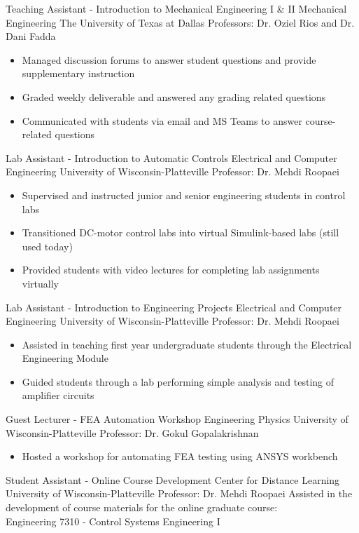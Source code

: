 \documentclass[11pt,letterpaper,roman]{moderncv} %
\begin{document}
{Teaching Assistant - Introduction to Mechanical Engineering I \& II}
{Mechanical Engineering}
{The University of Texas at Dallas}
{Professors: Dr. Oziel Rios and Dr. Dani Fadda}
{\begin{itemize}
    \item Managed discussion forums to answer student questions and provide supplementary instruction
    \item Graded weekly deliverable and answered any grading related questions
    \item Communicated with students via email and MS Teams to answer course-related questions
\end{itemize}
}

{Lab Assistant - Introduction to Automatic Controls}
{Electrical and Computer Engineering}
{University of Wisconsin-Platteville}
{Professor: Dr. Mehdi Roopaei}
{\begin{itemize}
    \item Supervised and instructed junior and senior engineering students in control labs
    \item Transitioned DC-motor control labs into virtual Simulink-based labs (still used today)
    \item Provided students with video lectures for completing lab assignments virtually
\end{itemize}
}

{Lab Assistant - Introduction to Engineering Projects}
{Electrical and Computer Engineering}
{University of Wisconsin-Platteville}
{Professor: Dr. Mehdi Roopaei}
{\begin{itemize}
    \item Assisted in teaching first year undergraduate students through the Electrical Engineering Module
    \item Guided students through a lab performing simple analysis and testing of amplifier circuits
\end{itemize}
}

{Guest Lecturer - FEA Automation Workshop}
{Engineering Physics}
{University of Wisconsin-Platteville}
{Professor: Dr. Gokul Gopalakrishnan}
{\begin{itemize}
    \item Hosted a workshop for automating FEA testing using ANSYS workbench
\end{itemize}
}

{Student Assistant - Online Course Development}
{Center for Distance Learning}
{University of Wisconsin-Platteville}
{Professor: Dr. Mehdi Roopaei}
{Assisted in the development of course materials for the online graduate course:\\ Engineering 7310 - Control Systems Engineering I}
\end{document}
